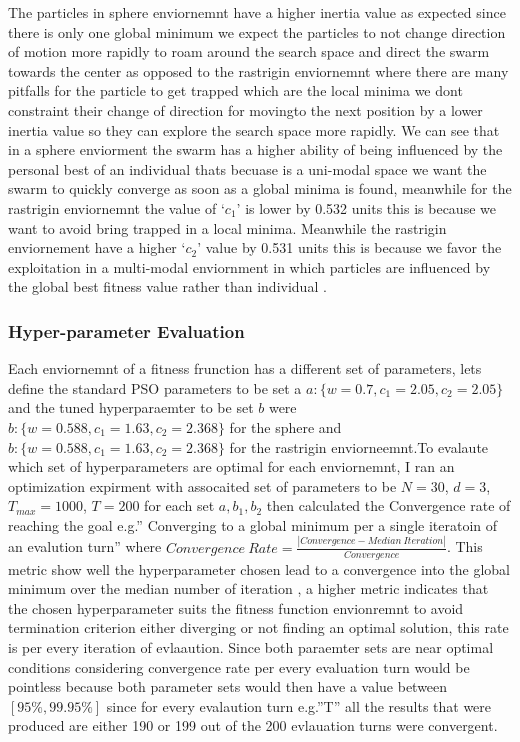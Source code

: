 \documentclass[
]{article}
\begin{document}
The particles in sphere enviornemnt have a higher inertia value as
expected since there is only one global minimum we expect the particles
to not change direction of motion more rapidly to roam around the search
space and direct the swarm towards the center as opposed to the
rastrigin enviornemnt where there are many pitfalls for the particle to
get trapped which are the local minima we dont constraint their change
of direction for movingto the next position by a lower inertia value so
they can explore the search space more rapidly. We can see that in a
sphere enviorment the swarm has a higher ability of being influenced by
the personal best of an individual thats becuase is a uni-modal space we
want the swarm to quickly converge as soon as a global minima is found,
meanwhile for the rastrigin enviornemnt the value of `\(c_1\)' is lower
by 0.532 units this is because we want to avoid bring trapped in a local
minima. Meanwhile the rastrigin enviornement have a higher `\(c_2\)'
value by 0.531 units this is because we favor the exploitation in a
multi-modal enviornment in which particles are influenced by the global
best fitness value rather than individual .

\hypertarget{hyper-parameter-evaluation}{%
\subsubsection{Hyper-parameter
Evaluation}\label{hyper-parameter-evaluation}}

Each enviornemnt of a fitness frunction has a different set of
parameters, lets define the standard PSO parameters to be set a
\(a:\{w=0.7,c_1=2.05,c_2=2.05\}\) and the tuned hyperparaemter to be set
\(b\) were \(b:\{w=0.588,c_1=1.63,c_2=2.368\}\) for the sphere and
\(b:\{w=0.588,c_1=1.63,c_2=2.368\}\) for the rastrigin enviorneemnt.To
evalaute which set of hyperparameters are optimal for each enviornemnt,
I ran an optimization expirment with assocaited set of parameters to be
\(N=30\), \(d=3\), \(T_{max}=1000\), \(T=200\) for each set
\(a,b_1,b_2\) then calculated the Convergence rate of reaching the goal
e.g.'' Converging to a global minimum per a single iteratoin of an
evalution turn'' where
\(Convergence \: Rate=\frac{|Convergence - Median \: Iteration|}{Convergence }\).
This metric show well the hyperparameter chosen lead to a convergence
into the global minimum over the median number of iteration , a higher
metric indicates that the chosen hyperparameter suits the fitness
function envionremnt to avoid termination criterion either diverging or
not finding an optimal solution, this rate is per every iteration of
evlaaution. Since both paraemter sets are near optimal conditions
considering convergence rate per every evaluation turn would be
pointless because both parameter sets would then have a value between
\([95\%,99.95\%]\) since for every evalaution turn e.g.''T'' all the
results that were produced are either 190 or 199 out of the 200
evlauation turns were convergent.
\end{document}
